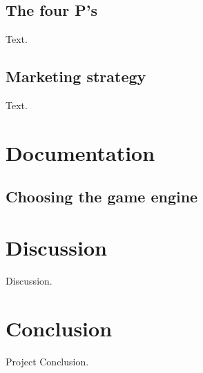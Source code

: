 \documentclass[12p]{article}
\begin{document}
\newpage


\subsection{The four P's} \label{TheFourPs}

Text.

\newpage


\subsection{Marketing strategy} \label{MarketingStrategy}

Text.


\newpage
\section{Documentation}

\subsection{Choosing the game engine}


\newpage
\section{Discussion}

Discussion.


\newpage
\section{Conclusion}

Project Conclusion.
\end{document}
